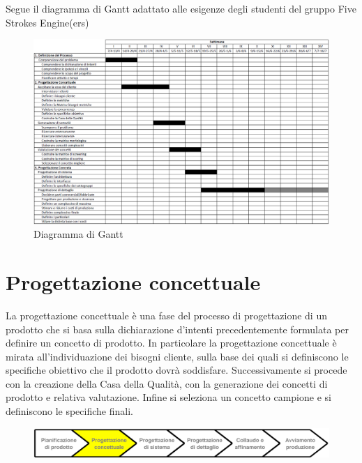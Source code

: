 \documentclass[12pt,a4paper,twoside]{report}  %
\begin{document}
Segue il diagramma di Gantt adattato alle esigenze degli studenti del gruppo Five Strokes Engine(ers)

\newpage
\begin{landscape}
\begin{figure}
    \centering
    \includegraphics[width=1\linewidth]{ganttModificato.png}
    \caption{Diagramma di Gantt}
    \label{fig:ganttModificato}
\end{figure}
\end{landscape}
\newpage

\chapter{Progettazione concettuale}
La progettazione concettuale è una fase del processo di progettazione di un prodotto che si basa sulla dichiarazione d'intenti precedentemente formulata per definire un concetto di prodotto. In particolare la progettazione concettuale è mirata all'individuazione dei bisogni cliente, sulla base dei quali si definiscono le specifiche obiettivo che il prodotto dovrà soddisfare. Successivamente si procede con la creazione della Casa della Qualità, con la generazione dei concetti di prodotto e relativa valutazione. Infine si seleziona un concetto campione e si definiscono le specifiche finali.
\begin{figure}[H] %
    \centering
    \includegraphics[width=1\linewidth]{progettazioneConcettuale.png}
    \label{fig:progettazioneConcettuale}
\end{figure}
\end{document}
